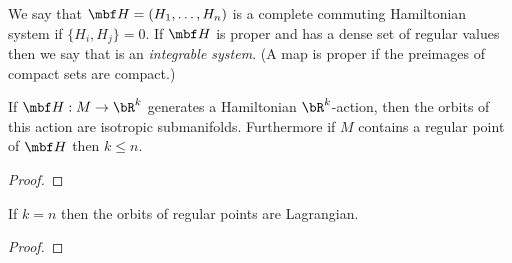 \begin{dfn}
    We say that $\mbf H=(H_1,\ldots,H_n)$ is a complete commuting Hamiltonian system if $\{H_i,H_j\}=0$.
    If $\mbf H$ is proper and has a dense set of regular values then we say that is an \emph{integrable system}.
    (A map is proper if the preimages of compact sets are compact.)
\end{dfn}

\begin{lem}
    If $\mbf H:M\to\bR^k$ generates a Hamiltonian $\bR^k$-action, then the orbits of this action are isotropic submanifolds.
    Furthermore if $M$ contains a regular point of $\mbf H$ then $k\le n$.
\end{lem}

\begin{proof}
\end{proof}

\begin{cor}
    If $k=n$ then the orbits of regular points are Lagrangian.
\end{cor}

\begin{proof}
\end{proof}
